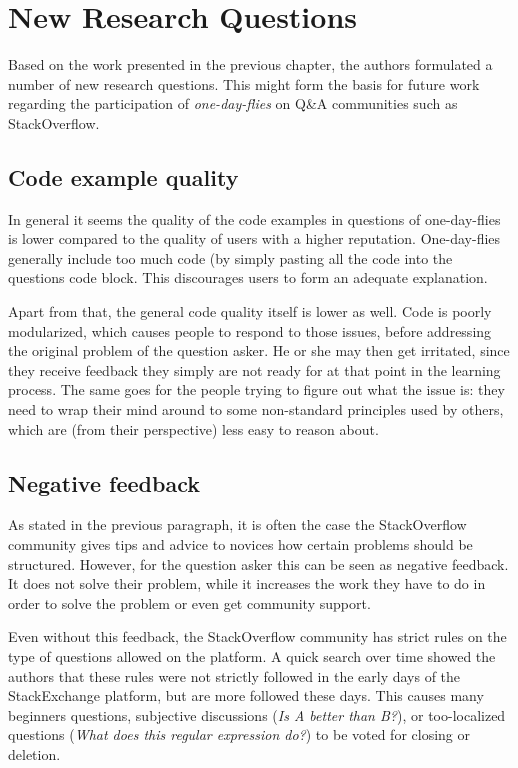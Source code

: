 \documentclass[conference]{IEEEtran}
\begin{document}
\section{New Research Questions} \label{NewResearchQuestions}

Based on the work presented in the previous chapter, the authors formulated a
number of new research questions. This might form the basis for future work
regarding the participation of \textit{one-day-flies} on Q\&A communities such
as StackOverflow.

\subsection{Code example quality}

In general it seems the quality of the code examples in questions of
one-day-flies is lower compared to the quality of users with a higher
reputation. One-day-flies generally include too much code (by simply pasting
all the code into the questions code block. This discourages users to form an
adequate explanation.

Apart from that, the general code quality itself is lower as well. Code is
poorly modularized, which causes people to respond to those issues, before
addressing the original problem of the question asker. He or she may then get
irritated, since they receive feedback they simply are not ready for at that
point in the learning process. The same goes for the people trying to figure
out what the issue is: they need to wrap their mind around to some non-standard
principles used by others, which are (from their perspective) less easy to
reason about.

\subsection{Negative feedback}

As stated in the previous paragraph, it is often the case the StackOverflow
community gives tips and advice to novices how certain problems should be
structured. However, for the question asker this can be seen as negative
feedback. It does not solve their problem, while it increases the work they
have to do in order to solve the problem or even get community support.

Even without this feedback, the StackOverflow community has strict rules on the
type of questions allowed on the platform. A quick search over time showed the
authors that these rules were not strictly followed in the early days of the
StackExchange platform, but are more followed these days. This causes many
beginners questions, subjective discussions (\textit{Is A better than B?}), or
too-localized questions (\textit{What does this regular expression do?}) to be
voted for closing or deletion.
\end{document}
